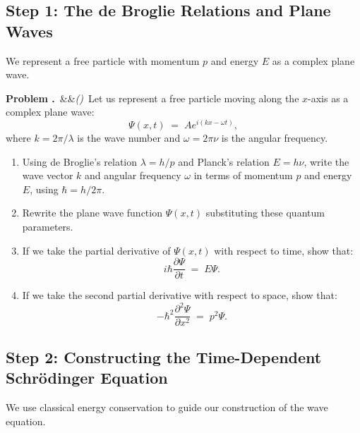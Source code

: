 \documentclass[12pt, a4paper, twoside]{book}
\newcounter{problem}[chapter]
\newcommand{\problem}[1][]{\refstepcounter{problem}\medskip\noindent
  \textcolor{accent}{\textbf{Problem \theproblem.}}\ \ifx&#1&\else\textit{(#1)}\ \fi}
\begin{document}
\subsection{Step 1: The de Broglie Relations and Plane Waves}

We represent a free particle with momentum $p$ and energy $E$ as a complex plane wave.

\begin{explobox}
\problem Let us represent a free particle moving along the $x$-axis as a complex plane wave:
\[
  \Psi(x, t) \;=\; A e^{i(kx - \omega t)},
\]
where $k = 2\pi/\lambda$ is the wave number and $\omega = 2\pi\nu$ is the angular frequency.
\begin{enumerate}[label=(\alph*), topsep=2pt]
  \item Using de Broglie's relation $\lambda = h/p$ and Planck's relation $E = h\nu$, write the wave vector $k$ and angular frequency $\omega$ in terms of momentum $p$ and energy $E$, using $\hbar = h/2\pi$.
  \item Rewrite the plane wave function $\Psi(x, t)$ substituting these quantum parameters.
  \item If we take the partial derivative of $\Psi(x, t)$ with respect to time, show that:
  \[
    i\hbar \frac{\partial \Psi}{\partial t} \;=\; E \Psi.
  \]
  \item If we take the second partial derivative with respect to space, show that:
  \[
    -\hbar^2 \frac{\partial^2 \Psi}{\partial x^2} \;=\; p^2 \Psi.
  \]
\end{enumerate}
\end{explobox}

\subsection{Step 2: Constructing the Time-Dependent Schrödinger Equation}

We use classical energy conservation to guide our construction of the wave equation.
\end{document}
